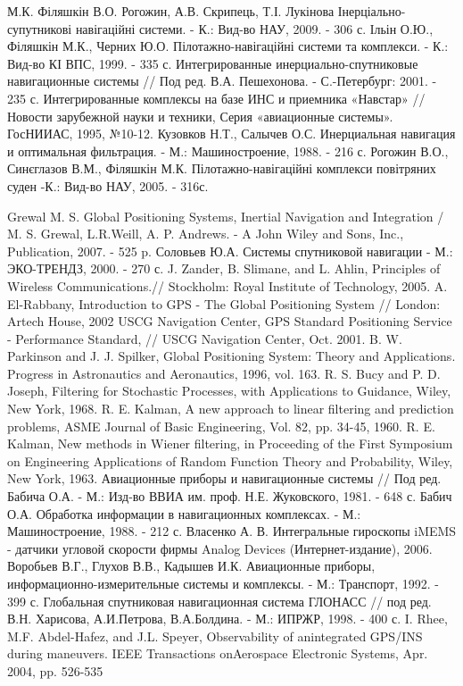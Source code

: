 \begin{thebibliography}{99}
 М.К. Філяшкін В.О. Рогожин, А.В. Скрипець, Т.І. Лукінова Інерціально-супутникові навігаційні  системи. - К.: Вид-во НАУ, 2009. - 306 с.
 Ільін О.Ю., Філяшкін М.К., Черних Ю.О. Пілотажно-навігаційні системи та комплекси. - К.: Вид-во КІ ВПС, 1999. - 335 с.
 Интегрированные инерциально-спутниковые навигационные системы // Под ред. В.А. Пешехонова. -  С.-Петербург: 2001. - 235 с.
 Интегрированные комплексы на базе ИНС и приемника «Навстар» // Новости зарубежной науки и техники, Серия «авиационные системы». ГосНИИАС, 1995, №10-12.
 Кузовков Н.Т., Салычев О.С. Инерциальная навигация и оптимальная фильтрация. - М.: Машиностроение, 1988.  - 216 с.
 Рогожин В.О., Синєглазов В.М., Філяшкін М.К. Пілотажно-навігаційні комплекси повітряних суден -К.: Вид-во НАУ, 2005. - 316с.

 Grewal M. S. Global Positioning Systems, Inertial Navigation and Integration / M. S. Grewal, L.R.Weill, A. P. Andrews. - A John Wiley and Sons, Inc., Publication, 2007. - 525 p.
 Соловьев Ю.А. Системы спутниковой навигации - М.: ЭКО-ТРЕНДЗ, 2000.  - 270 с. 
 J. Zander, B. Slimane, and L. Ahlin, Principles of Wireless Communications.// Stockholm: Royal Institute of Technology, 2005.
 A. El-Rabbany, Introduction to GPS - The Global Positioning System // London: Artech House, 2002
 USCG Navigation Center, GPS Standard Positioning Service - Performance Standard, // USCG Navigation Center, Oct. 2001.
 B. W. Parkinson and J. J. Spilker, Global Positioning System: Theory and
 Applications. Progress in Astronautics and Aeronautics, 1996, vol. 163.
 R. S. Bucy and P. D. Joseph, Filtering for Stochastic Processes, with Applications to Guidance, Wiley, New York, 1968.
 R. E. Kalman, A new approach to linear filtering and prediction problems, ASME Journal of Basic Engineering, Vol. 82, pp. 34-45, 1960.
 R. E. Kalman, New methods in Wiener filtering,  in Proceeding of the First Symposium on Engineering Applications of 
Random Function Theory and Probability, Wiley, New York, 1963.
 Авиационные приборы и навигационные системы // Под  ред. Бабича О.А. - М.: Изд-во ВВИА им. проф. Н.Е. Жуковского, 1981. - 648 с.
 Бабич О.А. Обработка информации в навигационных комплексах. - М.: Машиностроение, 1988.  - 212 с.
 Власенко А. В. Интегральные гироскопы iMEMS - датчики угловой скорости фирмы Analog Devices (Интернет-издание), 2006.
 Воробьев В.Г., Глухов В.В., Кадышев И.К. Авиационные приборы, информационно-измерительные системы и комплексы. - М.: Транспорт, 1992.  - 399 с.
 Глобальная спутниковая навигационная система ГЛОНАСС // под ред. В.Н. Харисова, А.И.Петрова, В.А.Болдина. - М.: ИПРЖР, 1998.  - 400 с. 
 I. Rhee, M.F. Abdel-Hafez, and J.L. Speyer, Observability of anintegrated GPS/INS during maneuvers. IEEE Transactions onAerospace  Electronic Systems, Apr. 2004, pp. 526-535

\end{thebibliography}

